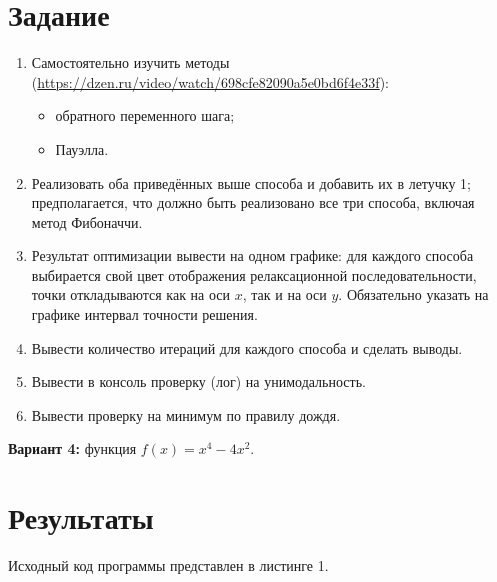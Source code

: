 \documentclass[a4paper, 14pt]{extarticle}
\begin{document}
\section{Задание}\label{Sect::task}
\begin{enumerate}
\item Самостоятельно изучить методы (\url{https://dzen.ru/video/watch/698cfe82090a5e0bd6f4e33f}):
\begin{itemize}
\item обратного переменного шага;
\item Пауэлла.
\end{itemize}

\item Реализовать оба приведённых выше способа и добавить их в летучку 1; предполагается, что должно быть реализовано все три способа, включая метод Фибоначчи.

\item Результат оптимизации вывести на одном графике: для каждого способа выбирается свой цвет отображения релаксационной последовательности, точки откладываются как на оси $x$, так и на оси $y$. Обязательно указать на графике интервал точности решения.

\item Вывести количество итераций для каждого способа и сделать выводы.

\item Вывести в консоль проверку (лог) на унимодальность.

\item Вывести проверку на минимум по правилу дождя.
\end{enumerate}

\textbf{Вариант 4:} функция $f(x) = x^4 - 4x^2$.

\section{Результаты}\label{Sect::res}

Исходный код программы представлен в листинге 1.
\end{document}
